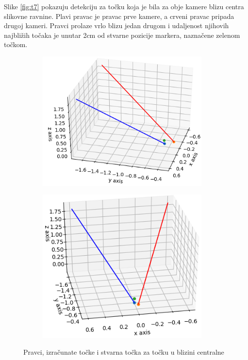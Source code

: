 \documentclass[times, utf8, diplomski]{fer}
\begin{document}
Slike \ref{fig:t7} pokazuju detekciju za točku koja je bila za obje kamere blizu centra slikovne ravnine. Plavi pravac je pravac prve kamere, a crveni pravac pripada drugoj kameri. Pravci prolaze vrlo blizu jedan drugom i udaljenost njihovih najbližih točaka je unutar 2cm od stvarne pozicije markera, naznačene zelenom točkom. 

\begin{figure}[h]
\begin{subfigure}[b]{.5\textwidth}
\centering
	\includegraphics[width=0.95\textwidth]{pravci_t8_1}
	\caption*{}
	\label{fig:t8_1}
\end{subfigure}
\begin{subfigure}[b]{.5\textwidth}
	\centering
	\includegraphics[width=0.95\textwidth]{pravci_t8_2}
	\caption*{}
	\label{fig:t8_2}
\end{subfigure}
\caption{Pravci, izračunate točke i stvarna točka za točku u blizini centralne}
\label{fig:t8}
\end{figure}
\end{document}
